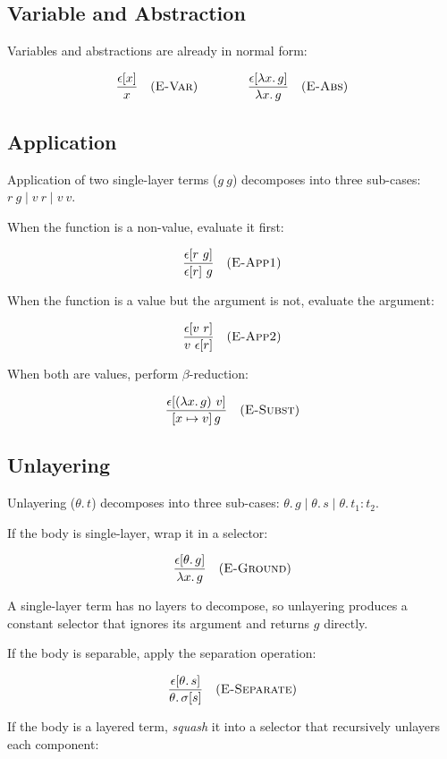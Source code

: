 \documentclass[11pt,letterpaper]{article}
\theoremstyle{definition}
\begin{document}
\subsection{Variable and Abstraction}

Variables and abstractions are already in normal form:

$$
\dfrac{\epsilon[x]}{x}
\quad (\textsc{E-Var})
\qquad\qquad
\dfrac{\epsilon[\lambda x.\,g]}{\lambda x.\,g}
\quad (\textsc{E-Abs})
$$

\subsection{Application}

Application of two single-layer terms ($g\ g$) decomposes into three
sub-cases: $r\ g \mid v\ r \mid v\ v$.

When the function is a non-value, evaluate it first:

$$
\dfrac{\epsilon[r\ g]}{\epsilon[r]\ g}
\quad (\textsc{E-App1})
$$

When the function is a value but the argument is not, evaluate the argument:

$$
\dfrac{\epsilon[v\ r]}{v\ \epsilon[r]}
\quad (\textsc{E-App2})
$$

When both are values, perform $\beta$-reduction:

$$
\dfrac{\epsilon[(\lambda x.\,g)\ v]}{[x \mapsto v]\,g}
\quad (\textsc{E-Subst})
$$

\subsection{Unlayering}

Unlayering ($\theta.\,t$) decomposes into three sub-cases:
$\theta.\,g \mid \theta.\,s \mid \theta.\,t_1{:}t_2$.


If the body is single-layer, wrap it in a selector:

$$
\dfrac{\epsilon[\theta.\,g]}{\lambda x.\, g}
\quad (\textsc{E-Ground})
$$

A single-layer term has no layers to decompose, so unlayering produces a
constant selector that ignores its argument and returns $g$ directly.

If the body is separable, apply the separation operation:

$$
\dfrac{\epsilon[\theta.\,s]}{\theta.\,\sigma[s]}
\quad (\textsc{E-Separate})
$$

If the body is a layered term, \emph{squash} it into a selector that
recursively unlayers each component:
\end{document}
